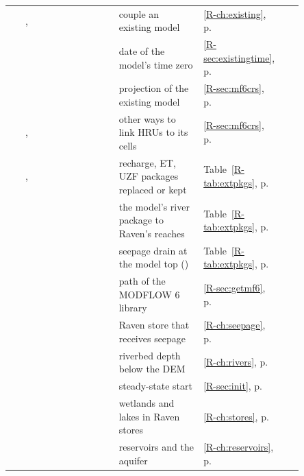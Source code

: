\begin{longtable}{P{0.05\linewidth}P{0.31\linewidth}P{0.29\linewidth}P{0.14\linewidth}P{0.06\linewidth}}
 & ,  & couple an existing model & \ref{R-ch:existing}, p.\,\pageref{R-ch:existing} & \pageref{R-cmd:MF6Simulation}\\
 &  & date of the model's time zero & \ref{R-sec:existingtime}, p.\,\pageref{R-sec:existingtime} & \pageref{R-cmd:MF6StartDate}\\
 &  & projection of the existing model & \ref{R-sec:mf6crs}, p.\,\pageref{R-sec:mf6crs} & \pageref{R-cmd:MF6CRS}\\
 & ,  & other ways to link HRUs to its cells & \ref{R-sec:mf6crs}, p.\,\pageref{R-sec:mf6crs} & \pageref{R-cmd:MF6GridFile}\\
 & ,  & recharge, ET, UZF packages replaced or kept & Table~\ref{R-tab:extpkgs}, p.\,\pageref{R-tab:extpkgs} & \pageref{R-cmd:RavenTakesOver}\\
 &  & the model's river package to Raven's reaches & Table~\ref{R-tab:extpkgs}, p.\,\pageref{R-tab:extpkgs} & \pageref{R-cmd:StreamPackage}\\
 &  & seepage drain at the model top () & Table~\ref{R-tab:extpkgs}, p.\,\pageref{R-tab:extpkgs} & \pageref{R-cmd:SeepageToRaven}\\
 &  & path of the MODFLOW 6 library & \ref{R-sec:getmf6}, p.\,\pageref{R-sec:getmf6} & \pageref{R-cmd:MF6Library}\\
 &  & Raven store that receives seepage & \ref{R-ch:seepage}, p.\,\pageref{R-ch:seepage} & \pageref{R-cmd:SeepageReturnTo}\\
 &  & riverbed depth below the DEM & \ref{R-ch:rivers}, p.\,\pageref{R-ch:rivers} & \pageref{R-cmd:RiverBedDepth}\\
 &  & steady-state start & \ref{R-sec:init}, p.\,\pageref{R-sec:init} & \pageref{R-cmd:GWInitialization}\\
 &  & wetlands and lakes in Raven stores & \ref{R-ch:stores}, p.\,\pageref{R-ch:stores} & \pageref{R-cmd:SurfaceWaterExchange}\\
 &  & reservoirs and the aquifer & \ref{R-ch:reservoirs}, p.\,\pageref{R-ch:reservoirs} & \pageref{R-cmd:ReservoirExchange}\\

\end{longtable}
